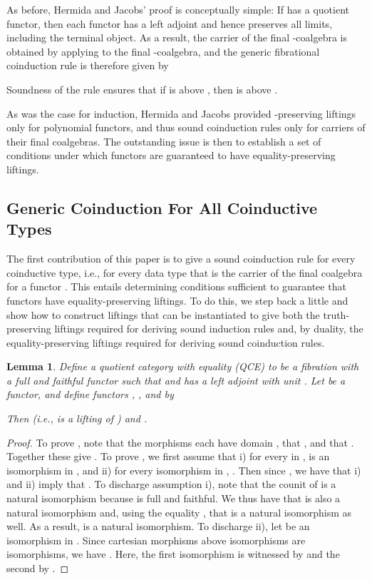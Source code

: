 \documentclass{LMCS}
\theoremstyle{plain}
\newtheorem{lemma}[theorem]{Lemma}
\theoremstyle{remark}
\theoremstyle{definition}
\begin{document}
As before, Hermida and Jacobs' proof is conceptually simple: If 
has a quotient functor, then each functor  has a left
adjoint and hence preserves all limits, including the terminal
object. As a result, the carrier of the final -coalgebra is
obtained by applying  to the final -coalgebra, and the generic
fibrational coinduction rule is therefore given by
 
\noindent
Soundness of the rule ensures that if  is
above , then  is above .

As was the case for induction, Hermida and Jacobs provided
-preserving liftings only for polynomial functors, and thus sound
coinduction rules only for carriers of their final coalgebras.  The
outstanding issue is then to establish a set of conditions under which
functors are guaranteed to have equality-preserving liftings.

\subsection{Generic Coinduction For All Coinductive Types}

The first contribution of this paper is to give a sound coinduction
rule for every coinductive type, i.e., for every data type that
is the carrier  of the final coalgebra for a functor . This
entails determining conditions sufficient to guarantee that functors
have equality-preserving liftings.  To do this, we step back a little
and show how to construct liftings that can be instantiated to give
both the truth-preserving liftings required for deriving sound
induction rules and, by duality, the equality-preserving liftings
required for deriving sound coinduction rules.

\begin{lemma}\label{lem:coindlift}
  Define a {\em quotient category with equality} (QCE) to be a
  fibration  with a full and faithful functor 
  such that  and  has a left adjoint  with
  unit . Let  be a functor, and define functors
  , , and  by

Then  (i.e.,  is a lifting of ) and
.
\end{lemma}
\begin{proof}
  To prove , note that the morphisms  each
  have domain , that , and
  that . Together these give .  To prove , we first
  assume that i) for every  in ,  is an isomorphism
  in , and ii) for every isomorphism  in , . Then since , we have that
  i) and ii) imply that . To discharge
  assumption i), note that the counit  of  is a natural isomorphism because  is full and faithful. We
  thus have that  is also a natural isomorphism and, using
  the equality , that  is a
  natural isomorphism as well. As a result,  is a
  natural isomorphism.
To discharge ii), let  be an isomorphism in . Since cartesian
morphisms above isomorphisms are isomorphisms, we have .
Here, the first isomorphism is witnessed by  and the second by
  .
\end{proof}
\end{document}
